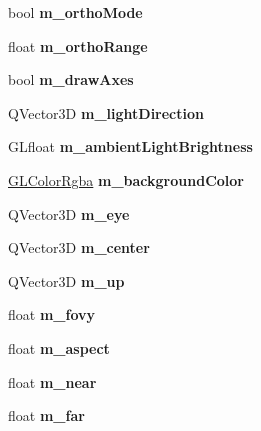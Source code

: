 \begin{DoxyCompactItemize}
bool {\bfseries m\+\_\+ortho\+Mode}
\item 
\mbox{\label{class_g_l_item_a9829d649c448ca4a92b5ccac08d51d68}} 
float {\bfseries m\+\_\+ortho\+Range}
\item 
\mbox{\label{class_g_l_item_ac323dad2cc4683da8925b461856603d3}} 
bool {\bfseries m\+\_\+draw\+Axes}
\item 
\mbox{\label{class_g_l_item_a1d3d64533872bf01a9d472554c371871}} 
Q\+Vector3D {\bfseries m\+\_\+light\+Direction}
\item 
\mbox{\label{class_g_l_item_a81f1697f1783f043c424fca09eb5a2a5}} 
G\+Lfloat {\bfseries m\+\_\+ambient\+Light\+Brightness}
\item 
\mbox{\label{class_g_l_item_a54d5d7350de34add6a0f4616b2d9d3c7}} 
\mbox{\hyperlink{class_g_l_color_rgba}{G\+L\+Color\+Rgba}} {\bfseries m\+\_\+background\+Color}
\item 
\mbox{\label{class_g_l_item_a586ce733c3f1509966d0d0aaf7edde0d}} 
Q\+Vector3D {\bfseries m\+\_\+eye}
\item 
\mbox{\label{class_g_l_item_a2dc1570f2e0680183451cb59545c0c94}} 
Q\+Vector3D {\bfseries m\+\_\+center}
\item 
\mbox{\label{class_g_l_item_abeb358b4ad8161c9837e875fe19da5ee}} 
Q\+Vector3D {\bfseries m\+\_\+up}
\item 
\mbox{\label{class_g_l_item_a77f1d70315398888649ae325745cec2d}} 
float {\bfseries m\+\_\+fovy}
\item 
\mbox{\label{class_g_l_item_a497f7f25c40790bf88b354b6ea432512}} 
float {\bfseries m\+\_\+aspect}
\item 
\mbox{\label{class_g_l_item_ac811c5b957f441dedd62736a8feecb80}} 
float {\bfseries m\+\_\+near}
\item 
\mbox{\label{class_g_l_item_ad5271d1dadd0691f4312fffe609ed93f}} 
float {\bfseries m\+\_\+far}

\end{DoxyCompactItemize}
